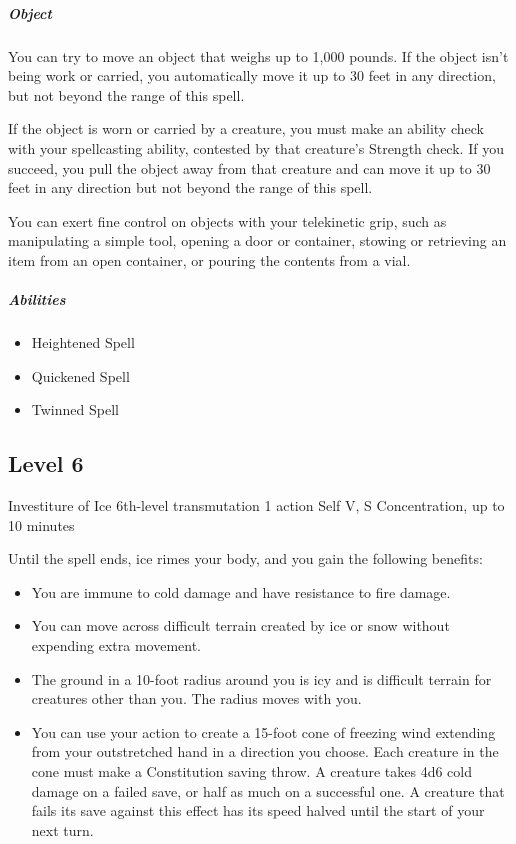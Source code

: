 \documentclass[a4paper,openany,twocolumn]{book}
\begin{document}
\subparagraph*{Object} You can try to move an object that weighs up to 1,000 pounds. If the object isn't being work or carried, you automatically move it up to 30 feet in any direction, but not beyond the range of this spell.

If the object is worn or carried by a creature, you must make an ability check with your spellcasting ability, contested by that creature's Strength check. If you succeed, you pull the object away from that creature and can move it up to 30 feet in any direction but not beyond the range of this spell.

You can exert fine control on objects with your telekinetic grip, such as manipulating a simple tool, opening a door or container, stowing or retrieving an item from an open container, or pouring the contents from a vial.

\subparagraph*{Abilities}
\begin{itemize}
  \item Heightened Spell
  \item Quickened Spell
  \item Twinned Spell
\end{itemize}


\subsection*{Level 6}

\DndSpellHeader
  {Investiture of Ice}
  {6th-level transmutation}
  {1 action}
  {Self}
  {V, S}
  {Concentration, up to 10 minutes}

Until the spell ends, ice rimes your body, and you gain the following benefits:
\begin{itemize}
  \item You are immune to cold damage and have resistance to fire damage.
  \item You can move across difficult terrain created by ice or snow without expending extra movement.
  \item The ground in a 10-foot radius around you is icy and is difficult terrain for creatures other than you. The radius moves with you.
  \item You can use your action to create a 15-foot cone of freezing wind extending from your outstretched hand in a direction you choose. Each creature in the cone must make a Constitution saving throw. A creature takes 4d6 cold damage on a failed save, or half as much on a successful one. A creature that fails its save against this effect has its speed halved until the start of your next turn.
\end{itemize}
\end{document}
